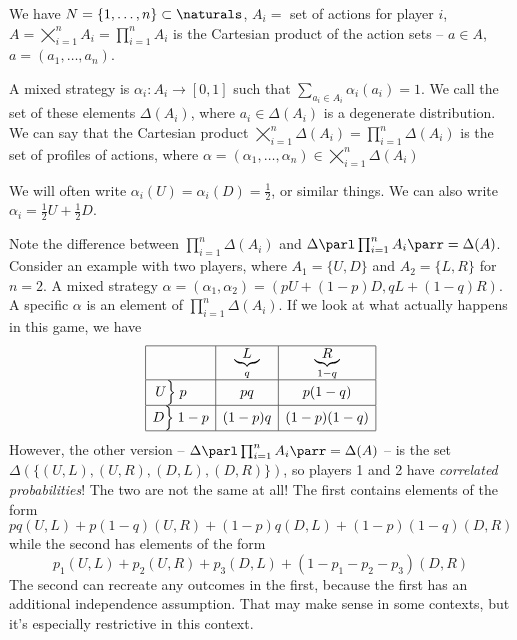 \documentclass[10pt]{article}
\begin{document}
\begin{definition}
	We have $N=\{1,\dots,n\} \subset \naturals$, $A_i = $ set of actions for player $i$, $A = \bigtimes_{i=1}^n A_i = \prod_{i=1}^n A_i$ is the Cartesian product of the action sets -- $a \in A$, $a = (a_1,\dots,a_n)$.
\end{definition}
\begin{definition}
	A mixed strategy is $\alpha_i: A_i \to [0,1]$ such that $\sum_{a_i \in A_i} \alpha_i (a_i) = 1$. We call the set of these elements $\Delta(A_i)$, where $a_i \in \Delta(A_i)$ is a degenerate distribution. We can say that the Cartesian product $\bigtimes_{i=1}^n \Delta(A_i) = \prod_{i=1}^n \Delta( A_i)$ is the set of profiles of actions, where $\alpha = (\alpha_1,\dots,\alpha_n) \in \bigtimes_{i=1}^n \Delta(A_i)$
\end{definition}
\begin{remark}
	We will often write $\alpha_i(U) = \alpha_i(D) = \frac{1}{2}$, or similar things. We can also write $\alpha_i = \frac{1}{2}U+\frac{1}{2}D$.
\end{remark}
\begin{remark}
	Note the difference between $\prod_{i=1}^n \Delta(A_i)$ and $\Delta\parl\prod_{i=1}^n A_i\parr = \Delta(A)$. Consider an example with two players, where $A_1 = \{U,D\}$ and $A_2 = \{L,R\}$ for $n = 2$. A mixed strategy $\alpha = (\alpha_1,\alpha_2) = (pU + (1-p)D,qL+(1-q)R)$. A specific $\alpha$ is an element of $\prod_{i=1}^n \Delta(A_i)$. If we look at what actually happens in this game, we have
	\[
	\begin{array}{|c|c|c|}
		\hline
		& \underbrace{L}_q &\underbrace{R}_{1-q} \\
		\hline 
		U \Big\} \;p\;\;\;\;\; & pq & p(1-q) \\
		\hline
		D \Big\} \; 1-p & (1-p)q & (1-p)(1-q) \\\hline
	\end{array}
	\]
	However, the other version -- $\Delta\parl\prod_{i=1}^n A_i\parr = \Delta(A)$ -- is the set $\Delta(\{(U,L),(U,R),(D,L),(D,R)\})$, so players 1 and 2 have \emph{correlated probabilities}! The two are not the same at all! The first contains elements of the form
	\[
	pq(U,L) + p(1-q)(U,R) + (1-p)q(D,L) + (1-p)(1-q)(D,R)
	\]
	while the second has elements of the form
	\[
	p_1(U,L) + p_2(U,R) + p_3(D,L) + (1-p_1-p_2-p_3)(D,R)
	\]
	The second can recreate any outcomes in the first, because the first has an additional independence assumption. That may make sense in some contexts, but it's especially restrictive in this context.
\end{remark}
\end{document}
